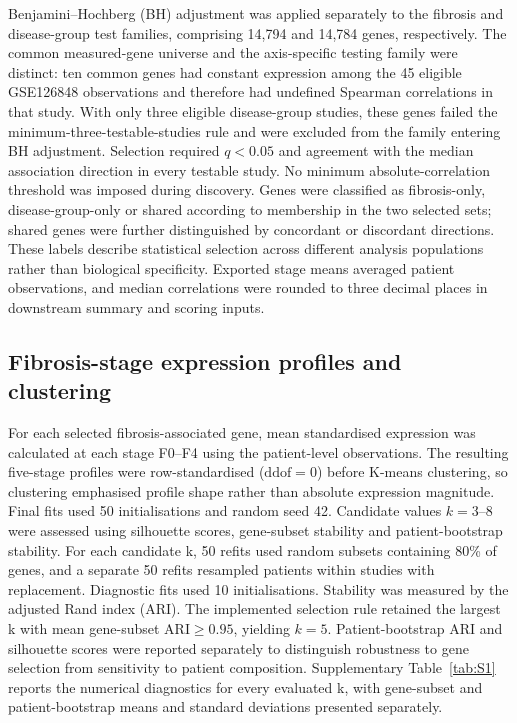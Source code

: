\documentclass[11pt,a4paper]{article}
\begin{document}
Benjamini--Hochberg (BH) adjustment \cite{ref11} was applied separately to the fibrosis and disease-group test families, comprising 14,794 and 14,784 genes, respectively. The common measured-gene universe and the axis-specific testing family were distinct: ten common genes had constant expression among the 45 eligible GSE126848 observations and therefore had undefined Spearman correlations in that study. With only three eligible disease-group studies, these genes failed the minimum-three-testable-studies rule and were excluded from the family entering BH adjustment. Selection required \(q<0.05\) and agreement with the median association direction in every testable study. No minimum absolute-correlation threshold was imposed during discovery. Genes were classified as fibrosis-only, disease-group-only or shared according to membership in the two selected sets; shared genes were further distinguished by concordant or discordant directions. These labels describe statistical selection across different analysis populations rather than biological specificity. Exported stage means averaged patient observations, and median correlations were rounded to three decimal places in downstream summary and scoring inputs.

\subsection*{Fibrosis-stage expression profiles and clustering}
For each selected fibrosis-associated gene, mean standardised expression was calculated at each stage F0--F4 using the patient-level observations. The resulting five-stage profiles were row-standardised (\(\mathrm{ddof}=0\)) before K-means clustering, so clustering emphasised profile shape rather than absolute expression magnitude. Final fits used 50 initialisations and random seed 42. Candidate values \(k=3\)--8 were assessed using silhouette scores, gene-subset stability and patient-bootstrap stability. For each candidate k, 50 refits used random subsets containing 80\% of genes, and a separate 50 refits resampled patients within studies with replacement. Diagnostic fits used 10 initialisations. Stability was measured by the adjusted Rand index (ARI). The implemented selection rule retained the largest k with mean gene-subset \(\mathrm{ARI}\geq0.95\), yielding \(k=5\). Patient-bootstrap ARI and silhouette scores were reported separately to distinguish robustness to gene selection from sensitivity to patient composition. Supplementary Table~\ref{tab:S1} reports the numerical diagnostics for every evaluated k, with gene-subset and patient-bootstrap means and standard deviations presented separately.
\end{document}
